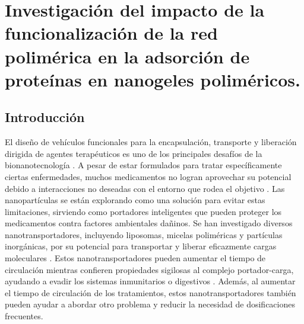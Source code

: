 \chapter{Investigaci\'on del impacto de la funcionalizaci\'on de la red polim\'erica en la adsorci\'on de prote\'inas en nanogeles polim\'ericos.}
\label{Chapter-esfericas}
\section{Introducci\'on}




El dise\~no de veh\'iculos funcionales para la encapsulaci\'on, transporte y liberaci\'on dirigida de agentes terap\'euticos es uno de los principales desaf\'ios de la bionanotecnolog\'ia \cite{ye2018review}.
A pesar de estar formulados para tratar espec\'ificamente ciertas enfermedades, muchos medicamentos no logran aprovechar su potencial debido a interacciones no deseadas con el entorno que rodea el objetivo \cite{ibraheem2014administration}.
Las nanopart\'iculas se est\'an explorando como una soluci\'on para evitar estas limitaciones, sirviendo como portadores inteligentes que pueden proteger los medicamentos contra factores ambientales da\~ninos.
Se han investigado diversos nanotransportadores, incluyendo liposomas, micelas polim\'ericas y part\'iculas inorg\'anicas, por su potencial para transportar y liberar eficazmente cargas moleculares \cite{chamundeeswari2019nanocarriers, lopez2012organic}.
Estos nanotransportadores pueden aumentar el tiempo de circulaci\'on mientras confieren propiedades sigilosas al complejo portador-carga, ayudando a evadir los sistemas inmunitarios o digestivos \cite{gaucher2010polymeric}.
Adem\'as, al aumentar el tiempo de circulaci\'on de los tratamientos, estos nanotransportadores tambi\'en pueden ayudar a abordar otro problema y reducir la necesidad de dosificaciones frecuentes.


